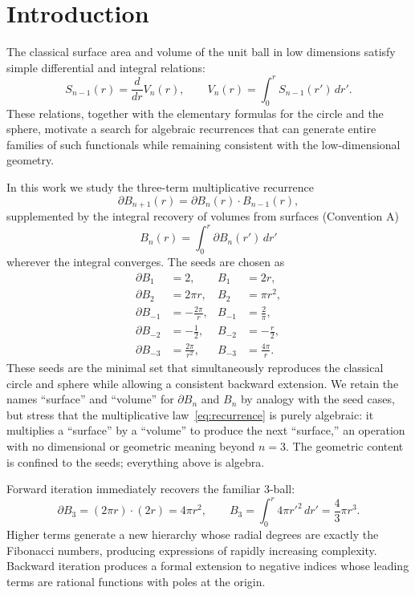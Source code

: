 \documentclass[11pt,a4paper]{article}
\theoremstyle{definition}
\begin{document}
\section{Introduction}

The classical surface area and volume of the unit ball in low dimensions satisfy simple differential and integral relations:
\[
S_{n-1}(r) = \frac{d}{dr} V_n(r), \qquad V_n(r) = \int_0^r S_{n-1}(r') \, dr'.
\]
These relations, together with the elementary formulas for the circle and the sphere, motivate a search for algebraic recurrences that can generate entire families of such functionals while remaining consistent with the low-dimensional geometry.

In this work we study the three-term multiplicative recurrence
\begin{equation}\label{eq:recurrence}
\partial B_{n+1}(r) = \partial B_n(r) \cdot B_{n-1}(r),
\end{equation}
supplemented by the integral recovery of volumes from surfaces (Convention A)
\begin{equation}\label{eq:integral}
B_n(r) = \int_0^r \partial B_n(r') \, dr'
\end{equation}
wherever the integral converges. The seeds are chosen as
\begin{align*}
\partial B_1 &= 2, & B_1 &= 2r, \\
\partial B_2 &= 2\pi r, & B_2 &= \pi r^2, \\
\partial B_{-1} &= -\frac{2\pi}{r}, & B_{-1} &= \frac{2}{\pi}, \\
\partial B_{-2} &= -\frac12, & B_{-2} &= -\frac{r}{2}, \\
\partial B_{-3} &= \frac{2\pi}{r^2}, & B_{-3} &= \frac{4\pi}{r}.
\end{align*}
These seeds are the minimal set that simultaneously reproduces the classical circle and sphere while allowing a consistent backward extension. We retain the names ``surface'' and ``volume'' for \(\partial B_n\) and \(B_n\) by analogy with the seed cases, but stress that the multiplicative law~\eqref{eq:recurrence} is purely algebraic: it multiplies a ``surface'' by a ``volume'' to produce the next ``surface,'' an operation with no dimensional or geometric meaning beyond \(n=3\). The geometric content is confined to the seeds; everything above is algebra.

Forward iteration immediately recovers the familiar 3-ball:
\[
\partial B_3 = (2\pi r)\cdot(2r) = 4\pi r^2, \qquad B_3 = \int_0^r 4\pi r'^2 \, dr' = \frac{4}{3}\pi r^3.
\]
Higher terms generate a new hierarchy whose radial degrees are exactly the Fibonacci numbers, producing expressions of rapidly increasing complexity. Backward iteration produces a formal extension to negative indices whose leading terms are rational functions with poles at the origin.
\end{document}
